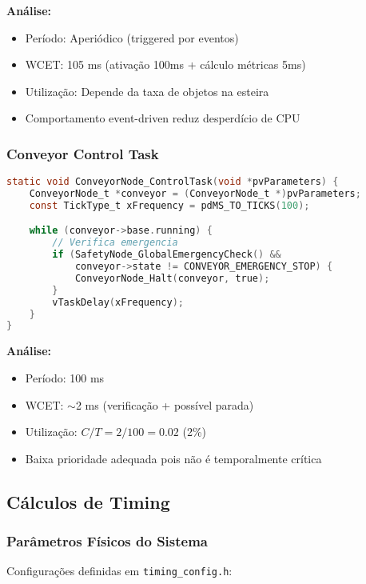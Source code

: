 \documentclass[12pt,a4paper]{article}
\begin{document}
\textbf{Análise:}
\begin{itemize}
    \item Período: Aperiódico (triggered por eventos)
    \item WCET: 105 ms (ativação 100ms + cálculo métricas 5ms)
    \item Utilização: Depende da taxa de objetos na esteira
    \item Comportamento event-driven reduz desperdício de CPU
\end{itemize}

\subsubsection{Conveyor Control Task}

\begin{lstlisting}[language=C, caption={ConveyorNode\_ControlTask - Prioridade 2}]
static void ConveyorNode_ControlTask(void *pvParameters) {
    ConveyorNode_t *conveyor = (ConveyorNode_t *)pvParameters;
    const TickType_t xFrequency = pdMS_TO_TICKS(100);

    while (conveyor->base.running) {
        // Verifica emergencia
        if (SafetyNode_GlobalEmergencyCheck() &&
            conveyor->state != CONVEYOR_EMERGENCY_STOP) {
            ConveyorNode_Halt(conveyor, true);
        }
        vTaskDelay(xFrequency);
    }
}
\end{lstlisting}

\textbf{Análise:}
\begin{itemize}
    \item Período: 100 ms
    \item WCET: $\sim$2 ms (verificação + possível parada)
    \item Utilização: $C/T = 2/100 = 0.02$ (2\%)
    \item Baixa prioridade adequada pois não é temporalmente crítica
\end{itemize}

\subsection{Cálculos de Timing}

\subsubsection{Parâmetros Físicos do Sistema}

Configurações definidas em \texttt{timing\_config.h}:
\end{document}
